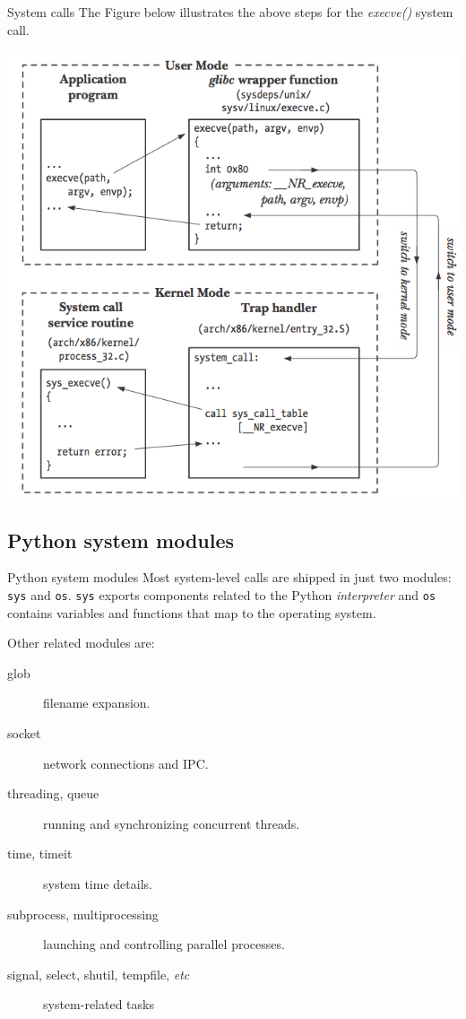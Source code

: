 \documentclass[xcolor=dvipsnames, 10pt, presentation,aspectratio=169]{beamer}
\begin{document}
\begin{frame}[label={sec:org293cf65}]{System calls}
The Figure below illustrates the above steps for the \emph{execve()} system call.
\begin{center}
  \includegraphics[scale=0.6]{systemCall.png}
\end{center}
\end{frame}

\subsection{Python system modules}
\label{sec:orgaa917e2}
\begin{frame}[label={sec:org6bb375c},fragile]{Python system modules}
 Most system-level calls are shipped in just two modules: \texttt{sys} and
\texttt{os}. \texttt{sys} exports components related to the Python \emph{interpreter} and \texttt{os}
contains variables and functions that map to the operating system.

Other related modules are:
\begin{description}
\item[{glob}] filename expansion.
\item[{socket}] network connections and IPC.
\item[{threading, queue}] running and synchronizing concurrent threads.
\item[{time, timeit}] system time details.
\item[{subprocess, multiprocessing}] launching and controlling parallel processes.
\item[{signal, select, shutil, tempfile, \emph{etc}}] system-related tasks
\end{description}
\end{frame}
\end{document}
